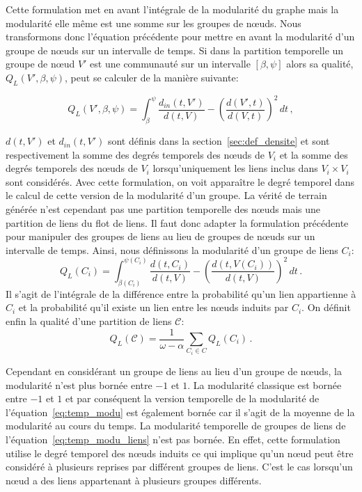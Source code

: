 Cette formulation met en avant l'intégrale de la modularité du graphe mais la modularité elle même est une somme sur les groupes de n\oe{}uds.
Nous transformons donc l'équation précédente pour mettre en avant la modularité d'un groupe de n\oe{}uds sur un intervalle de temps.
Si dans la partition temporelle un groupe de n\oe{}ud $V'$ est une communauté sur un intervalle $[\beta, \psi]$ alors sa qualité, $Q_L(V', \beta, \psi)$, peut se calculer de la manière suivante:

\begin{equation}
Q_L(V', \beta, \psi)  = \int_{\beta}^{\psi} \! \dfrac{d_{in}(t,V')}{d(t,V)} - \left( \dfrac{d(V',t)}{d(V,t)} \right)^2  \, dt\, ,
\end{equation}

$d(t,V')$ et $d_{in}(t,V')$ sont définis dans la section~\ref{sec:def_densite} et sont respectivement la somme des degrés temporels des n\oe{}uds de $V_i$ et la somme des degrés temporels des n\oe{}uds de $V_i$ lorsqu'uniquement les liens inclus dans $V_i \times V_i$ sont considérés.
Avec cette formulation, on voit apparaître le degré temporel dans le calcul de cette version de la modularité d'un groupe.
La vérité de terrain générée n'est cependant pas une partition temporelle des n\oe{}uds mais une partition de liens du flot de liens.
Il faut donc adapter la formulation précédente pour manipuler des groupes de liens au lieu de groupes de n\oe{}uds sur un intervalle de temps.
Ainsi, nous définissons la modularité d'un groupe de liens $C_i$:
\begin{equation}
Q_L(C_i)  = \int_{\beta(C_i)}^{\psi(C_i)} \! \dfrac{d(t,C_i)}{d(t,V)} -  \left( \dfrac{d(t,V(C_i))}{d(t,V)} \right)^2 \, dt \,.
\label{}
\end{equation}
Il s'agit de l'intégrale de la différence entre la probabilité qu'un lien appartienne à $C_i$ et la probabilité qu'il existe un lien entre les n\oe{}uds induits par $C_i$.
On définit enfin la qualité d'une partition de liens $\mathcal{C}$:
\begin{equation}
Q_L(\mathcal{C}) = \dfrac{1}{\omega-\alpha} \sum_{C_i \in C} Q_L(C_i)\, .
\label{eq:temp_modu_liens}
\end{equation}

Cependant en considérant un groupe de liens au lieu d'un groupe de n\oe{}uds, la modularité n'est plus bornée entre $-1$ et $1$.
La modularité classique est bornée entre $-1$ et $1$ et par conséquent la version temporelle de la modularité de l'équation~\ref{eq:temp_modu} est également bornée car il s'agit de la moyenne de la modularité au cours du temps.
La modularité temporelle de groupes de liens de l'équation~\ref{eq:temp_modu_liens} n'est pas bornée.
En effet, cette formulation utilise le degré temporel des n\oe{}uds induits ce qui implique qu'un n\oe{}ud peut être considéré à plusieurs reprises par différent groupes de liens.
C'est le cas lorsqu'un n\oe{}ud a des liens appartenant à plusieurs groupes différents.

